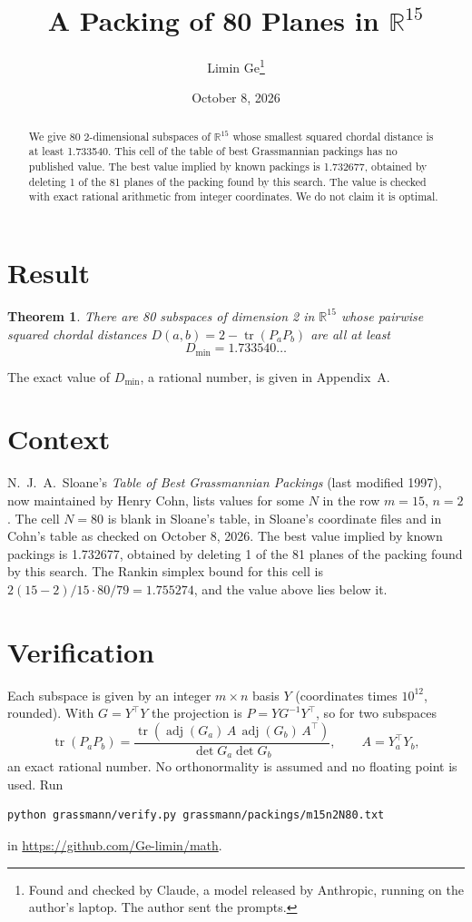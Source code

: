 \documentclass[11pt,a4paper]{article}
\title{A Packing of 80 Planes in $\mathbb{R}^{15}$}
\author{Limin Ge\thanks{Found and checked by Claude, a model released by Anthropic, running on the author's laptop. The author sent the prompts.}}
\date{October 8, 2026}
\newtheorem*{theorem}{Theorem}
\begin{document}
\maketitle
\begin{abstract}
We give 80 2-dimensional subspaces of $\mathbb{R}^{15}$ whose smallest squared chordal distance is at least 1.733540. This cell of the table of best Grassmannian packings has no published value. The best value implied by known packings is 1.732677, obtained by deleting 1 of the 81 planes of the packing found by this search. The value is checked with exact rational arithmetic from integer coordinates. We do not claim it is optimal.
\end{abstract}

\section{Result}
\begin{theorem}
There are 80 subspaces of dimension 2 in $\mathbb{R}^{15}$ whose pairwise squared chordal distances $D(a,b) = 2 - \operatorname{tr}(P_aP_b)$ are all at least
\[ D_{\min} = 1.733540\ldots \]
\end{theorem}
The exact value of $D_{\min}$, a rational number, is given in Appendix~A.


\section{Context}
N.~J.~A.~Sloane's \emph{Table of Best Grassmannian Packings} (last modified 1997), now maintained by Henry Cohn, lists values for some $N$ in the row $m=15$, $n=2$. The cell $N=80$ is blank in Sloane's table, in Sloane's coordinate files and in Cohn's table as checked on October 8, 2026. The best value implied by known packings is 1.732677, obtained by deleting 1 of the 81 planes of the packing found by this search. The Rankin simplex bound for this cell is $2(15-2)/15\cdot 80/79 = 1.755274$, and the value above lies below it.


\section{Verification}
Each subspace is given by an integer $m\times n$ basis $Y$ (coordinates times $10^{12}$, rounded). With $G=Y^\top Y$ the projection is $P=YG^{-1}Y^\top$, so for two subspaces
\[ \operatorname{tr}(P_aP_b)=\frac{\operatorname{tr}(\operatorname{adj}(G_a)\,A\,\operatorname{adj}(G_b)\,A^\top)}{\det G_a\det G_b},\qquad A=Y_a^\top Y_b, \]
an exact rational number. No orthonormality is assumed and no floating point is used. Run
\begin{verbatim}
python grassmann/verify.py grassmann/packings/m15n2N80.txt
\end{verbatim}
in \url{https://github.com/Ge-limin/math}.
\end{document}
